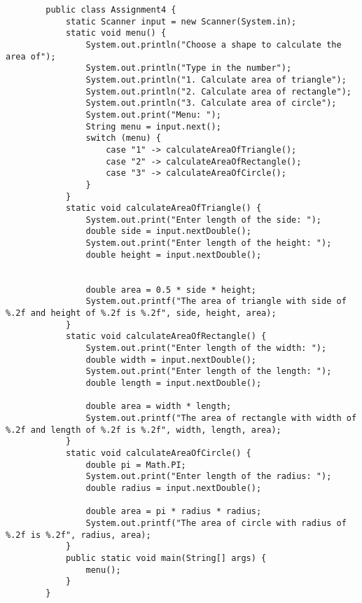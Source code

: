 \documentclass[12pt,titlepage]{article}
\begin{document}
\begin{enumerate}
\begin{verbatim}
        public class Assignment4 {
            static Scanner input = new Scanner(System.in);
            static void menu() {
                System.out.println("Choose a shape to calculate the area of");
                System.out.println("Type in the number");
                System.out.println("1. Calculate area of triangle");
                System.out.println("2. Calculate area of rectangle");
                System.out.println("3. Calculate area of circle");
                System.out.print("Menu: ");
                String menu = input.next();
                switch (menu) {
                    case "1" -> calculateAreaOfTriangle();
                    case "2" -> calculateAreaOfRectangle();
                    case "3" -> calculateAreaOfCircle();
                }
            }
            static void calculateAreaOfTriangle() {
                System.out.print("Enter length of the side: ");
                double side = input.nextDouble();
                System.out.print("Enter length of the height: ");
                double height = input.nextDouble();


                double area = 0.5 * side * height;
                System.out.printf("The area of triangle with side of %.2f and height of %.2f is %.2f", side, height, area);
            }
            static void calculateAreaOfRectangle() {
                System.out.print("Enter length of the width: ");
                double width = input.nextDouble();
                System.out.print("Enter length of the length: ");
                double length = input.nextDouble();

                double area = width * length;
                System.out.printf("The area of rectangle with width of %.2f and length of %.2f is %.2f", width, length, area);
            }
            static void calculateAreaOfCircle() {
                double pi = Math.PI;
                System.out.print("Enter length of the radius: ");
                double radius = input.nextDouble();

                double area = pi * radius * radius;
                System.out.printf("The area of circle with radius of %.2f is %.2f", radius, area);
            }
            public static void main(String[] args) {
                menu();
            }
        }

    \end{verbatim}
\end{enumerate}
\end{document}
